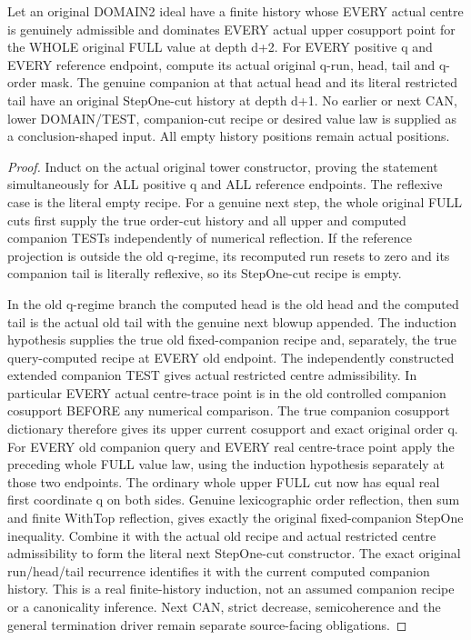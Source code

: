 \begin{theorem}
\label{hir:original-full-cut-all-current-companion-stepone-history}
\leanok
Let an original DOMAIN2 ideal have a finite history whose EVERY actual
centre is genuinely admissible and dominates EVERY actual upper cosupport
point for the WHOLE original FULL value at depth d+2. For EVERY positive q
and EVERY reference endpoint, compute its actual original q-run, head,
tail and q-order mask. The genuine companion at that actual head and its
literal restricted tail have an original StepOne-cut history at depth d+1.
No earlier or next CAN, lower DOMAIN/TEST, companion-cut recipe or desired
value law is supplied as a conclusion-shaped input. All empty history
positions remain actual positions.
\end{theorem}
\begin{proof}
Induct on the actual original tower constructor, proving the statement
simultaneously for ALL positive q and ALL reference endpoints. The
reflexive case is the literal empty recipe. For a genuine next step, the
whole original FULL cuts first supply the true order-cut history and all
upper and computed companion TESTs independently of numerical reflection.
If the reference projection is outside the old q-regime, its recomputed
run resets to zero and its companion tail is literally reflexive, so its
StepOne-cut recipe is empty.

In the old q-regime branch the computed head is the old head and the
computed tail is the actual old tail with the genuine next blowup appended.
The induction hypothesis supplies the true old fixed-companion recipe and,
separately, the true query-computed recipe at EVERY old endpoint. The
independently constructed extended companion TEST gives actual restricted
centre admissibility. In particular EVERY actual centre-trace point is in
the old controlled companion cosupport BEFORE any numerical comparison.
The true companion cosupport dictionary therefore gives its upper current
cosupport and exact original order q. For EVERY old companion query and
EVERY real centre-trace point apply the preceding whole FULL value law,
using the induction hypothesis separately at those two endpoints. The
ordinary whole upper FULL cut now has equal real first coordinate q on
both sides. Genuine lexicographic order reflection, then sum and finite
WithTop reflection, gives exactly the original fixed-companion StepOne
inequality. Combine it with the actual old recipe and actual restricted
centre admissibility to form the literal next StepOne-cut constructor.
The exact original run/head/tail recurrence identifies it with the current
computed companion history. This is a real finite-history induction, not
an assumed companion recipe or a canonicality inference. Next CAN,
strict decrease, semicoherence and the general termination driver remain
separate source-facing obligations.
\end{proof}

